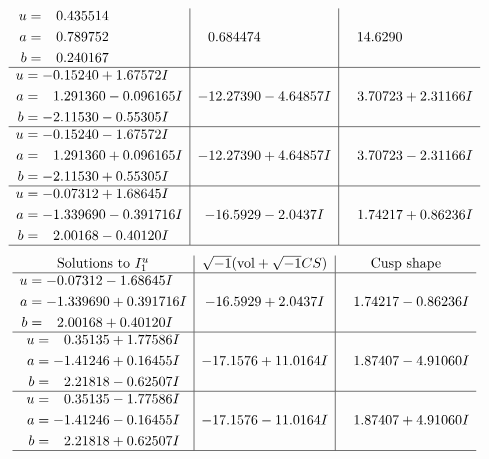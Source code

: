 \documentclass[1p]{elsarticle_modified}
\theoremstyle{definition}
\newcommand{\I}{\sqrt{-1}}
\begin{document}
$$\begin{array}{c|c|c}
\begin{aligned}
u &= \phantom{-}0.435514\phantom{ +0.000000I} \\
a &= \phantom{-}0.789752\phantom{ +0.000000I} \\
b &= \phantom{-}0.240167\phantom{ +0.000000I}\end{aligned}
 & \phantom{-}0.684474\phantom{ +0.000000I} & \phantom{-}14.6290\phantom{ +0.000000I} \\ \hline\begin{aligned}
u &= -0.15240 + 1.67572 I \\
a &= \phantom{-}1.291360 - 0.096165 I \\
b &= -2.11530 - 0.55305 I\end{aligned}
 & -12.27390 - 4.64857 I & \phantom{-}3.70723 + 2.31166 I \\ \hline\begin{aligned}
u &= -0.15240 - 1.67572 I \\
a &= \phantom{-}1.291360 + 0.096165 I \\
b &= -2.11530 + 0.55305 I\end{aligned}
 & -12.27390 + 4.64857 I & \phantom{-}3.70723 - 2.31166 I \\ \hline\begin{aligned}
u &= -0.07312 + 1.68645 I \\
a &= -1.339690 - 0.391716 I \\
b &= \phantom{-}2.00168 - 0.40120 I\end{aligned}
 & -16.5929 - 2.0437 I & \phantom{-}1.74217 + 0.86236 I\\
 \hline 
 \end{array}$$\newpage$$\begin{array}{c|c|c}  
\text{Solutions to }I^u_{1}& \I (\text{vol} + \sqrt{-1}CS) & \text{Cusp shape}\\
 \hline 
\begin{aligned}
u &= -0.07312 - 1.68645 I \\
a &= -1.339690 + 0.391716 I \\
b &= \phantom{-}2.00168 + 0.40120 I\end{aligned}
 & -16.5929 + 2.0437 I & \phantom{-}1.74217 - 0.86236 I \\ \hline\begin{aligned}
u &= \phantom{-}0.35135 + 1.77586 I \\
a &= -1.41246 + 0.16455 I \\
b &= \phantom{-}2.21818 - 0.62507 I\end{aligned}
 & -17.1576 + 11.0164 I & \phantom{-}1.87407 - 4.91060 I \\ \hline\begin{aligned}
u &= \phantom{-}0.35135 - 1.77586 I \\
a &= -1.41246 - 0.16455 I \\
b &= \phantom{-}2.21818 + 0.62507 I\end{aligned}
 & -17.1576 - 11.0164 I & \phantom{-}1.87407 + 4.91060 I\\
 \hline 
 \end{array}$$\newpage\newpage\renewcommand{\arraystretch}{1}
\end{document}
